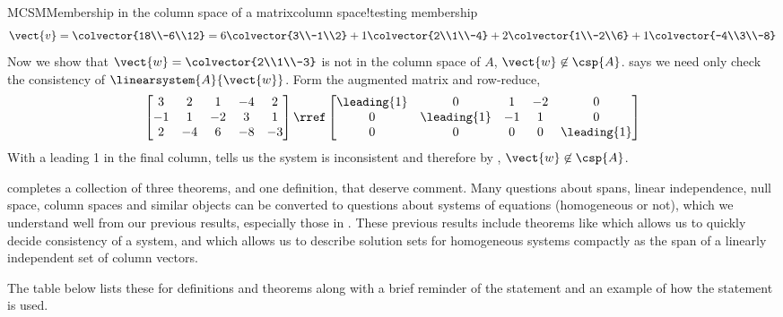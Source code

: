 \begin{example}{MCSM}{Membership in the column space of a matrix}{column space!testing membership}
%
\begin{equation*}
\vect{v}=\colvector{18\\-6\\12}=
6\colvector{3\\-1\\2}+
1\colvector{2\\1\\-4}+
2\colvector{1\\-2\\6}+
1\colvector{-4\\3\\-8}
\end{equation*}
%
Now we show that $\vect{w}=\colvector{2\\1\\-3}$ is not in the column space of $A$, $\vect{w}\not\in\csp{A}$.   says we need only check the consistency of $\linearsystem{A}{\vect{w}}$.  Form the augmented matrix and row-reduce,
%
\begin{equation*}
\begin{bmatrix}
3 & 2 & 1 & -4 & 2\\
-1 & 1 & -2 & 3 & 1\\
2 & -4 & 6 & -8 & -3
\end{bmatrix}
%
\rref
%
\begin{bmatrix}
\leading{1} & 0 & 1 & -2 & 0\\
0 & \leading{1} & -1 & 1 & 0\\
0 & 0 & 0 & 0 & \leading{1}
\end{bmatrix}
\end{equation*}
%
With a leading 1 in the final column,  tells us the system is inconsistent and therefore by , $\vect{w}\not\in\csp{A}$.
%
\end{example}
%
 completes a collection of three theorems, and one definition, that deserve comment.  Many questions about spans, linear independence, null space, column spaces and similar objects can be converted to questions about systems of equations (homogeneous or not), which we understand well from our previous results, especially those in .  These previous results include theorems like  which allows us to quickly decide consistency of a system, and  which allows us to describe solution sets for homogeneous systems compactly as the span of a linearly independent set of column vectors.\par
%
The table below lists these for definitions and theorems along with a brief reminder of the statement and an example of how the statement is used.
